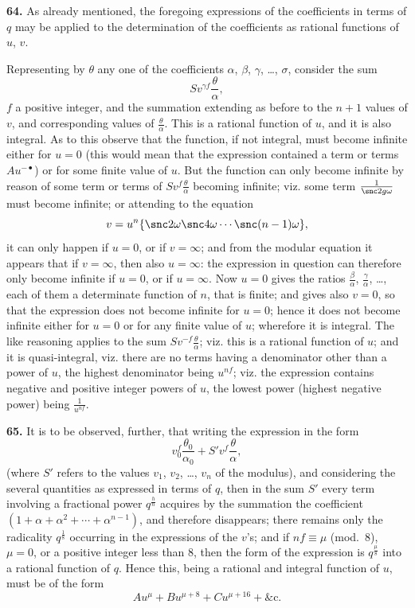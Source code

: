 \documentclass[11pt,a4paper]{book}
\begin{document}
\textbf{64.} As already mentioned, the foregoing expressions of the coefficients in terms of $q$ may be applied to the determination of the coefficients as rational functions of $u$, $v$.

Representing by $\theta$ any one of the coefficients $\alpha$, $\beta$, $\gamma$, \ldots, $\sigma$, consider the sum
\[
S v^{\gamma f} \frac{\theta}{\alpha},
\]
$f$ a positive integer, and the summation extending as before to the $n + 1$ values of $v$, and corresponding values of $\frac{\theta}{\alpha}$. This is a rational function of $u$, and it is also integral. As to this observe that the function, if not integral, must become infinite either for $u = 0$ (this would mean that the expression contained a term or terms $Au^{-\bullet}$) or for some finite value of $u$. But the function can only become infinite by reason of some term or terms of $Sv^{f}\frac{\theta}{\alpha}$ becoming infinite; viz. some term $\frac{1}{\snc 2g\omega}$ must become infinite; or attending to the equation
\[
v = u^n\{\snc 2\omega \snc 4\omega \cdots \snc (n-1)\omega\},
\]
it can only happen if $u = 0$, or if $v = \infty$; and from the modular equation it appears that if $v = \infty$, then also $u = \infty$: the expression in question can therefore only become infinite if $u = 0$, or if $u = \infty$. Now $u = 0$ gives the ratios $\frac{\beta}{\alpha}$, $\frac{\gamma}{\alpha}$, \ldots, each of them a determinate function of $n$, that is finite; and gives also $v = 0$, so that the expression does not become infinite for $u = 0$; hence it does not become infinite either for $u = 0$ or for any finite value of $u$; wherefore it is integral. The like reasoning applies to the sum $Sv^{-f}\frac{\theta}{\alpha}$; viz. this is a rational function of $u$; and it is quasi-integral, viz. there are no terms having a denominator other than a power of $u$, the highest denominator being $u^{nf}$; viz. the expression contains negative and positive integer powers of $u$, the lowest power (highest negative power) being $\frac{1}{u^{nf}}$.

\textbf{65.} It is to be observed, further, that writing the expression in the form
\[
v_0^{\!f} \frac{\theta_0}{\alpha_0} + S' v^{\!f} \frac{\theta}{\alpha},
\]
(where $S'$ refers to the values $v_1$, $v_2$, \ldots, $v_n$ of the modulus), and considering the several quantities as expressed in terms of $q$, then in the sum $S'$ every term involving a fractional power $q^{\frac{h}{n}}$ acquires by the summation the coefficient $(1 + \alpha + \alpha^2 + \cdots + \alpha^{n-1})$, and therefore disappears; there remains only the radicality $q^{\frac{1}{8}}$ occurring in the expressions of the $v$'s; and if $nf \equiv \mu$ (mod.~8), $\mu = 0$, or a positive integer less than 8, then the form of the expression is $q^{\frac{\mu}{8}}$ into a rational function of $q$. Hence this, being a rational and integral function of $u$, must be of the form
\[
Au^{\mu} + Bu^{\mu+8} + Cu^{\mu+16} + \&\text{c.}
\]
\end{document}
